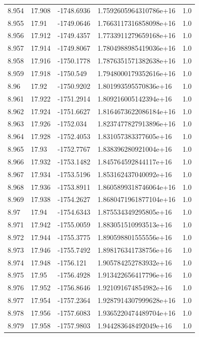\begin{tabular}{lllll}
8.954 & 17.908 & -1748.6936 & 1.7592605964310786e+16 & 1.0 \\
8.955 & 17.91 & -1749.0646 & 1.7663117316858098e+16 & 1.0 \\
8.956 & 17.912 & -1749.4357 & 1.7733911279659168e+16 & 1.0 \\
8.957 & 17.914 & -1749.8067 & 1.7804988985419036e+16 & 1.0 \\
8.958 & 17.916 & -1750.1778 & 1.7876351571382638e+16 & 1.0 \\
8.959 & 17.918 & -1750.549 & 1.7948000179352616e+16 & 1.0 \\
8.96 & 17.92 & -1750.9202 & 1.801993595570836e+16 & 1.0 \\
8.961 & 17.922 & -1751.2914 & 1.809216005142394e+16 & 1.0 \\
8.962 & 17.924 & -1751.6627 & 1.8164673622086184e+16 & 1.0 \\
8.963 & 17.926 & -1752.034 & 1.8237477827913896e+16 & 1.0 \\
8.964 & 17.928 & -1752.4053 & 1.831057383377605e+16 & 1.0 \\
8.965 & 17.93 & -1752.7767 & 1.838396280921004e+16 & 1.0 \\
8.966 & 17.932 & -1753.1482 & 1.845764592844117e+16 & 1.0 \\
8.967 & 17.934 & -1753.5196 & 1.853162437040092e+16 & 1.0 \\
8.968 & 17.936 & -1753.8911 & 1.8605899318746064e+16 & 1.0 \\
8.969 & 17.938 & -1754.2627 & 1.8680471961877104e+16 & 1.0 \\
8.97 & 17.94 & -1754.6343 & 1.875534349295805e+16 & 1.0 \\
8.971 & 17.942 & -1755.0059 & 1.883051510993513e+16 & 1.0 \\
8.972 & 17.944 & -1755.3775 & 1.890598801555556e+16 & 1.0 \\
8.973 & 17.946 & -1755.7492 & 1.898176341738756e+16 & 1.0 \\
8.974 & 17.948 & -1756.121 & 1.905784252783932e+16 & 1.0 \\
8.975 & 17.95 & -1756.4928 & 1.913422656417796e+16 & 1.0 \\
8.976 & 17.952 & -1756.8646 & 1.921091674854982e+16 & 1.0 \\
8.977 & 17.954 & -1757.2364 & 1.9287914307999628e+16 & 1.0 \\
8.978 & 17.956 & -1757.6083 & 1.9365220474489704e+16 & 1.0 \\
8.979 & 17.958 & -1757.9803 & 1.944283648492049e+16 & 1.0 \\

\end{tabular}
